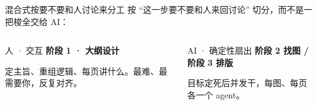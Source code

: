 \begin{frame}{混合式}{按要不要和人讨论来分工}
  按 \alert{“这一步要不要和人来回讨论”} 切分，而不是一把梭全交给 AI：
  \bigskip
  \begin{columns}[T,onlytextwidth]
      \begin{block}{人 · 交互}
        \textbf{阶段 1 · 大纲设计}

        \smallskip
        定主旨、重组逻辑、每页讲什么。最难、最需要你，反复对齐。
      \end{block}
      \begin{exampleblock}{AI · 确定性扇出}
        \textbf{阶段 2 找图 / 阶段 3 排版}

        \smallskip
        目标定死后并发干，每图、每页各一个 agent。
      \end{exampleblock}
  \end{columns}
  \bigskip
\end{frame}
